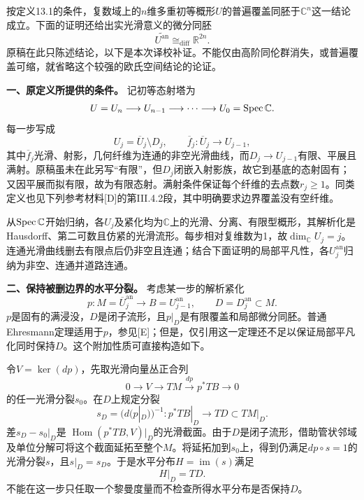 
按定义13.1的条件，复数域上的$n$维多重初等概形$U$的普遍覆盖同胚于$\mathbb C^n$这一结论成立。下面的证明还给出实光滑意义的微分同胚
\[
\widetilde{U^{\mathrm{an}}}\cong_{\mathrm{diff}}\mathbb R^{2n}.
\]
原稿在此只陈述结论，以下是本次译校补证。不能仅由高阶同伦群消失，或普遍覆盖可缩，就省略这个较强的欧氏空间结论的论证。

\par\medskip\noindent\textbf{一、原定义所提供的条件。}
记初等态射塔为
\[
U=U_n\longrightarrow U_{n-1}\longrightarrow\cdots
\longrightarrow U_0=\operatorname{Spec}\mathbb C.
\]
每一步写成
\[
U_j=\overline U_j\setminus D_j,\qquad
\overline f_j\colon\overline U_j\longrightarrow U_{j-1},
\]
其中$\overline f_j$光滑、射影，几何纤维为连通的非空光滑曲线，而$D_j\to U_{j-1}$有限、平展且满射。原稿虽未在此另写“有限”，但$D_j$闭嵌入射影族，故它到基底的态射固有；又因平展而拟有限，故为有限态射。满射条件保证每个纤维的去点数$r_j\geq1$。同类定义也见下列参考材料[D]的第III.4.2段，其中明确要求边界覆盖没有空纤维。

从$\operatorname{Spec}\mathbb C$开始归纳，各$U_j$及紧化均为$\mathbb C$上的光滑、分离、有限型概形，其解析化是Hausdorff、第二可数且仿紧的光滑流形。每步相对复维数为1，故$\dim_{\mathbb C}U_j=j$。连通光滑曲线删去有限点后仍非空且连通；结合下面证明的局部平凡性，各$U_j^{\mathrm{an}}$归纳为非空、连通并道路连通。

\par\medskip\noindent\textbf{二、保持被删边界的水平分裂。}
考虑某一步的解析紧化
\[
p\colon M=\overline U_j^{\mathrm{an}}\longrightarrow
B=U_{j-1}^{\mathrm{an}},\qquad D=D_j^{\mathrm{an}}\subset M.
\]
$p$是固有的满浸没，$D$是闭子流形，且$p|_D$是有限覆盖和局部微分同胚。普通Ehresmann定理适用于$p$，参见[E]；但是，仅引用这一定理还不足以保证局部平凡化同时保持$D$。这个附加性质可直接构造如下。

令$V=\ker(dp)$，先取光滑向量丛正合列
\[
0\longrightarrow V\longrightarrow TM
\overset{dp}{\longrightarrow}p^*TB\longrightarrow0
\]
的任一光滑分裂$s_0$。在$D$上规定分裂
\[
s_D=\bigl(d(p|_D)\bigr)^{-1}
\colon p^*TB|_D\longrightarrow TD\subset TM|_D.
\]
差$s_D-s_0|_D$是
$\operatorname{Hom}(p^*TB,V)|_D$的光滑截面。由于$D$是闭子流形，借助管状邻域及单位分解可将这个截面延拓至整个$M$。将延拓加到$s_0$上，得到仍满足$dp\circ s=1$的光滑分裂$s$，且$s|_D=s_D$。于是水平分布$H=\operatorname{im}(s)$满足
\[
H|_D=TD.
\]
不能在这一步只任取一个黎曼度量而不检查所得水平分布是否保持$D$。

